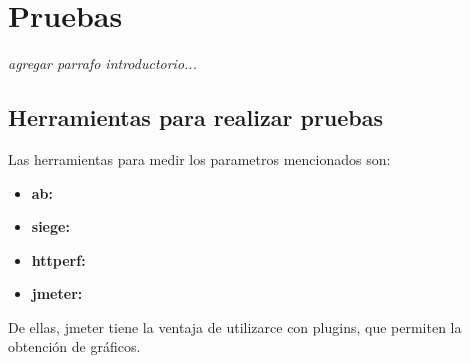 \section{Pruebas}
\textit{agregar parrafo introductorio...}\\






\subsection{Herramientas para realizar pruebas}
Las herramientas para medir los parametros mencionados son:

\begin{itemize}
 \item \textbf{ab:}
 \item \textbf{siege:}
 \item \textbf{httperf:}
 \item \textbf{jmeter:}
\end{itemize}

De ellas, jmeter tiene la ventaja de utilizarce con plugins, que permiten la obtención de gráficos.

\newpage